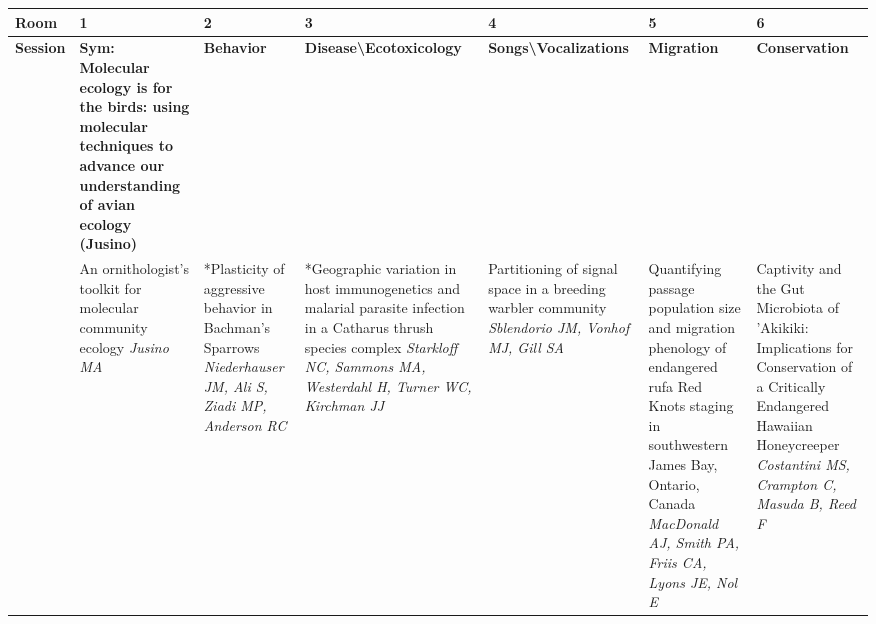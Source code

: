 \begin{tabular}{|x{0.75cm}|a{2.25cm}|x{2.25cm}|x{2.25cm}|x{2.25cm}|x{2.25cm}|x{2.25cm}|}\hline
Room & 1 & 2 & 3 & 4 & 5 & 6\\
\hline
\rule{0pt}{1em} \textbf{Session} &\footnotesize \textbf{Sym: Molecular ecology is for the birds: using molecular techniques to advance our understanding of avian ecology (Jusino)} & \footnotesize \textbf{Behavior} & \footnotesize \textbf{Disease\textbackslash Ecotoxicology} & \footnotesize \textbf{Songs\textbackslash Vocalizations} & \footnotesize \textbf{Migration} & \footnotesize \textbf{Conservation}\\
\hline
{}&An ornithologist's toolkit for molecular community ecology \newline \newline \textit{Jusino MA} & *Plasticity of aggressive behavior in Bachman’s Sparrows \newline \newline \textit{Niederhauser JM, Ali S, Ziadi MP, Anderson RC} & *Geographic variation in host immunogenetics and malarial parasite infection in a Catharus thrush species complex \newline \newline \textit{Starkloff NC, Sammons MA, Westerdahl H, Turner WC, Kirchman JJ} & Partitioning of signal space in a breeding warbler community \newline \newline \textit{Sblendorio JM, Vonhof MJ, Gill SA} & Quantifying passage population size and migration phenology of endangered rufa Red Knots staging in southwestern James Bay, Ontario, Canada \newline \newline \textit{MacDonald AJ, Smith PA, Friis CA, Lyons JE, Nol E} & Captivity and the Gut Microbiota of 'Akikiki: Implications for Conservation of a Critically Endangered Hawaiian Honeycreeper \newline \newline \textit{Costantini MS, Crampton C, Masuda B, Reed F}\\
\hline

\end{tabular}
